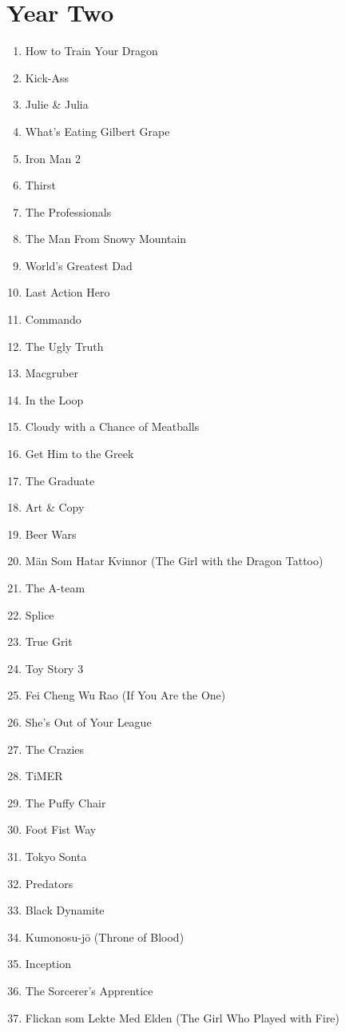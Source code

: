 \documentclass[11pt]{article}
\begin{document}
\section{Year Two}
\begin{enumerate}
\item How to Train Your Dragon
\item Kick-Ass
\item Julie \& Julia
\item What's Eating Gilbert Grape
\item Iron Man 2
\item Thirst
\item The Professionals
\item The Man From Snowy Mountain
\item World's Greatest Dad
\item Last Action Hero
\item Commando
\item The Ugly Truth
\item Macgruber
\item In the Loop
\item Cloudy with a Chance of Meatballs
\item Get Him to the Greek
\item The Graduate
\item Art \& Copy
\item Beer Wars
\item Män Som Hatar Kvinnor (The Girl with the Dragon Tattoo)
\item The A-team
\item Splice
\item True Grit
\item Toy Story 3
\item Fei Cheng Wu Rao (If You Are the One)
\item She's Out of Your League
\item The Crazies
\item TiMER
\item The Puffy Chair
\item Foot Fist Way
\item Tokyo Sonta 
\item Predators
\item Black Dynamite
\item Kumonosu-jō (Throne of Blood)
\item Inception
\item The Sorcerer's Apprentice
\item Flickan som Lekte Med Elden (The Girl Who Played with Fire)

\end{enumerate}
\end{document}
